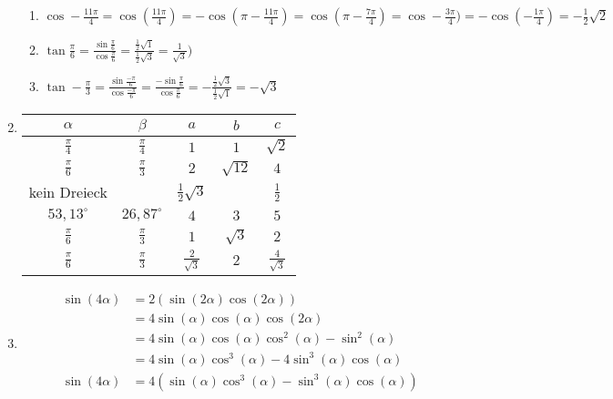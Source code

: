 \begin{enumerate}
\begin{enumerate}
   \item $\cos -\frac{11\pi}{4} = \cos (\frac{11\pi}{4}) = - \cos(\pi - \frac{11\pi}{4}) = \cos (\pi - \frac{7\pi}{4}) = \cos -\frac{3\pi}{4}) = - \cos( -\frac{1\pi}{4}) = - \frac{1}{2}\sqrt{2}$
   \item $\tan \frac{\pi}{6} = \frac{\sin \frac{\pi}{6}}{\cos \frac{\pi}{6}} = \frac{\frac{1}{2} \sqrt{1}}{\frac{1}{2} \sqrt{3}}= \frac{1}{\sqrt{3}})$
   \item $\tan -\frac{\pi}{3}= \frac{\sin \frac{-\pi}{6}}{\cos \frac{-\pi}{6}}=\frac{-\sin \frac{\pi}{6}}{\cos \frac{\pi}{6}} = - \frac{\frac{1}{2}\sqrt{3}}{\frac{1}{2}\sqrt{1}} = - \sqrt{3}$
  \end{enumerate}
  
  



\item


\begin{tabular}{ccccc}
$\alpha$ & $\beta$ & $a$ & $b$ & $c$ \\
\hline

$\frac{\pi}{4}$ & $\frac{\pi}{4}$ & $1$ & $1$ & $\sqrt{2}$ \\
$\frac{\pi}{6}$ & $\frac{\pi}{3}$ & $2$ & $\sqrt{12}$ & $4$\\ 
kein Dreieck &  & $\frac{1}{2}\sqrt{3}$ &  & $\frac{1}{2}$\\
$53,13^\circ$ & $26,87^\circ$ & $4$ & $3$ & $5$ \\
$\frac{\pi}{6}$ & $\frac{\pi}{3}$ & $1$ & $\sqrt{3}$ & $2$ \\
$\frac{\pi}{6}$ & $\frac{\pi}{3}$ & $\frac{2}{\sqrt{3}}$ & $2$ & $\frac{4}{\sqrt{3}}$ \\

\end{tabular}
 
\item
 \begin{align*}
 \sin(4\alpha) & = 2 (\sin(2\alpha) \cos(2\alpha)) \\
 							 & = 4 \sin(\alpha) \cos(\alpha) \cos(2\alpha) \\
 							 & = 4 \sin (\alpha) \cos (\alpha) \cos^2(\alpha) - \sin^2 (\alpha) \\
 							 & = 4 \sin (\alpha) \cos^{3} (\alpha) - 4 \sin ^{3} (\alpha) \cos (\alpha)	\\
 	\sin(4\alpha) & = 4 (\sin (\alpha) \cos^{3} (\alpha) - \sin ^{3} (\alpha) \cos (\alpha))	\\
 \end{align*}
 

\end{enumerate}
